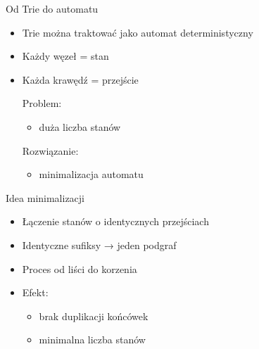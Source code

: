 \documentclass{beamer}
\begin{document}

\begin{frame}{Od Trie do automatu}
    \begin{itemize}
        \item Trie można traktować jako automat deterministyczny
        \item Każdy węzeł = stan
        \item Każda krawędź = przejście

              \vspace{0.5cm}
              Problem:
              \begin{itemize}
                  \item duża liczba stanów
              \end{itemize}

              Rozwiązanie:
              \begin{itemize}
                  \item minimalizacja automatu
              \end{itemize}
    \end{itemize}
\end{frame}


\begin{frame}{Idea minimalizacji}
    \begin{itemize}
        \item Łączenie stanów o identycznych przejściach
        \item Identyczne sufiksy → jeden podgraf
        \item Proces od liści do korzenia

              \vspace{0.5cm}

        \item Efekt:
              \begin{itemize}
                  \item brak duplikacji końcówek
                  \item minimalna liczba stanów
              \end{itemize}
    \end{itemize}
\end{frame}

\end{document}
